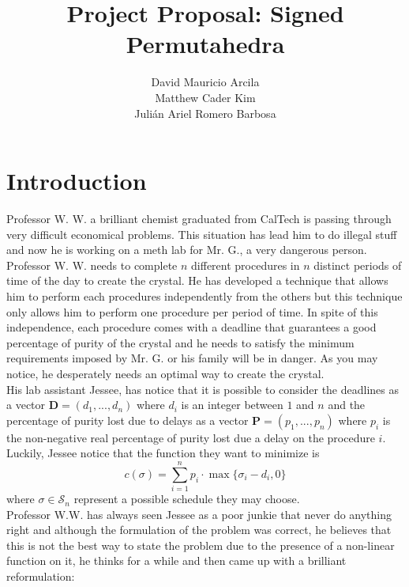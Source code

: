 \documentclass[12pt]{amsart}
\title{Project Proposal: Signed Permutahedra}
\author{David Mauricio Arcila \\ Matthew Cader Kim \\ Juli\'an Ariel Romero Barbosa}
\numberwithin{equation}{section}
\newcommand{\da}[1]{{\color{red} \sf $\clubsuit\clubsuit\clubsuit$ DA: [#1]}}
\newcommand{\mk}[1]{{\color{blue} \sf $\clubsuit\clubsuit\clubsuit$ MK: [#1]}}
\newcommand{\jr}[1]{{\color{brown} \sf $\clubsuit\clubsuit\clubsuit$ JR: [#1]}}
\begin{document}
\maketitle

\section{Introduction}

Professor W. W. a brilliant chemist graduated from CalTech is passing through very difficult economical problems. This situation has lead him to do illegal stuff and now he is working on a meth lab for Mr. G., a very dangerous person. Professor W. W. needs to complete $n$ different procedures  in $n$ distinct periods of time of the day to create the crystal. He has developed a technique that allows him to perform each procedures independently from the others but this technique only allows him to perform one procedure per period of time. In spite of this independence, each procedure comes with a deadline that guarantees a good percentage of purity of the crystal and he needs to satisfy the minimum requirements imposed by Mr. G. or his family will be in danger. As you may notice, he desperately needs an optimal way to create the crystal. \\
His lab assistant Jessee, has notice that it is possible to consider the deadlines as a vector $\textbf{D}=(d_1,...,d_n)$ where $d_i$ is an integer between $1$ and $n$ and the percentage of purity lost due to delays as a vector $\textbf{P}=(p_1,...,p_n)$ where $p_i$ is the non-negative real percentage of purity lost due a delay on the procedure $i$. Luckily, Jessee notice that the function they want to minimize is
$$
c(\sigma)= \sum_{i=1}^{n}p_i \cdot \max\{\sigma_{i}-d_i,0\} 
$$                       
where $\sigma \in \mathcal{S}_n$ represent a possible schedule they may choose. \\
Professor W.W. has always seen Jessee as a poor junkie that never do anything right and although the formulation of the problem was correct, he believes that this is not the best way to state the problem due to the presence of a non-linear function on it, he thinks for a while and then came up with a brilliant reformulation: \\
\end{document}

